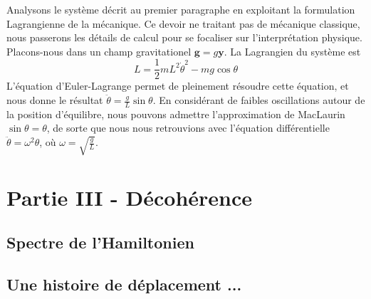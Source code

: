 \documentclass[11pt,oneside,a4paper]{article}
\begin{document}
Analysons le système décrit au premier paragraphe en exploitant la formulation Lagrangienne de la mécanique. Ce devoir ne traitant pas de mécanique classique, nous passerons les détails de calcul pour se focaliser sur l'interprétation physique. Placons-nous dans un champ gravitationel $\bm{g} = g\bm{\bm{y}}$. La Lagrangien du système est 
\begin{equation}
  L = \frac{1}{2}mL^2\dot{\theta}^2 - mg\cos\theta 
\end{equation}
L'équation d'Euler-Lagrange permet de pleinement résoudre cette équation, et nous donne le résultat $\ddot{\theta} = \frac{g}{L}\sin\theta$. En considérant de faibles oscillations autour de la position d'équilibre, nous pouvons admettre l'approximation de MacLaurin $\sin\theta=\theta$, de sorte que nous nous retrouvions avec l'équation différentielle $\ddot{\theta} = \omega^2\theta$, où $\omega = \sqrt{\frac{g}{L}}$.

\section{Partie III - Décohérence}
\subsection{Spectre de l'Hamiltonien}
\subsection{Une histoire de déplacement ...}
\end{document}
